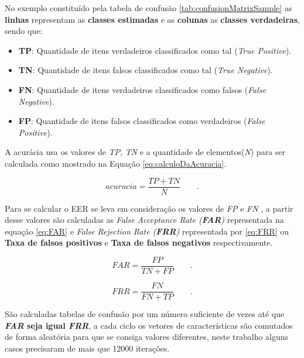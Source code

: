 		\par No exemplo constituído pela tabela de confusão \ref{tab:confusionMatrixSample} as \textbf{linhas} representam as \textbf{classes estimadas} e as \textbf{colunas} as \textbf{classes verdadeiras}, sendo que:
		\begin{itemize}
			\item \textbf{TP}: Quantidade de itens verdadeiros classificados como tal (\textit{True Positive}).
			\item \textbf{TN}: Quantidade de itens falsos classificados como tal (\textit{True Negative}).
			\item \textbf{FN}: Quantidade de itens verdadeiros classificados como falsos (\textit{False Negative}).
			\item \textbf{FP}: Quantidade de itens falsos classificados como verdadeiros (\textit{False Positive}).
		\end{itemize} 
		
		
		\par A acurácia usa os valores de \textit{TP}, \textit{TN} e a quantidade de elementos(\textit{N}) para ser calculada como mostrado na Equação \ref{eq:calculoDaAcuracia}.
		
		\begin{equation}
			acuracia = \dfrac{TP + TN}{N} \qquad.
			\label{eq:calculoDaAcuracia}
		\end{equation}

		\par Para se calcular o EER se leva em consideração os valores de \textit{FP} e \textit{FN} \cite{ghazali2018recent}, a partir desse valores são calculadas as \textit{False Acceptance Rate (\textbf{FAR})} representada na equação \ref{eq:FAR} e \textit{False Rejection Rate (\textbf{FRR})} representada por \ref{eq:FRR} ou \textbf{Taxa de falsos positivos} e \textbf{Taxa de falsos negativos} respectivamente.
		
		\begin{equation}
			FAR=\dfrac{FP}{TN+FP} \qquad.
			\label{eq:FAR}
		\end{equation}
		
		\begin{equation}
			FRR=\dfrac{FN}{FN+TP} \qquad.
			\label{eq:FRR}
		\end{equation}
				
		\par São calculadas tabelas de confusão por um número suficiente de vezes até que \textbf{\textit{FAR} seja igual \textit{FRR}}, a cada ciclo os vetores de características são comutados de forma aleatória para que se consiga valores diferentes, neste trabalho alguns casos precisaram de mais que 12000 iterações.
		
